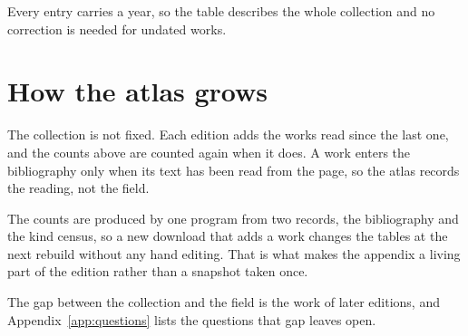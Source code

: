 Every entry carries a year, so the table describes the whole collection and
no correction is needed for undated works.

\section{How the atlas grows}

The collection is not fixed.
Each edition adds the works read since the last one, and the counts above are
counted again when it does.
A work enters the bibliography only when its text has been read from the page,
so the atlas records the reading, not the field.

The counts are produced by one program from two records, the bibliography and
the kind census, so a new download that adds a work changes the tables at the
next rebuild without any hand editing.
That is what makes the appendix a living part of the edition rather than a
snapshot taken once.

The gap between the collection and the field is the work of later editions, and
Appendix~\ref{app:questions} lists the questions that gap leaves open.
